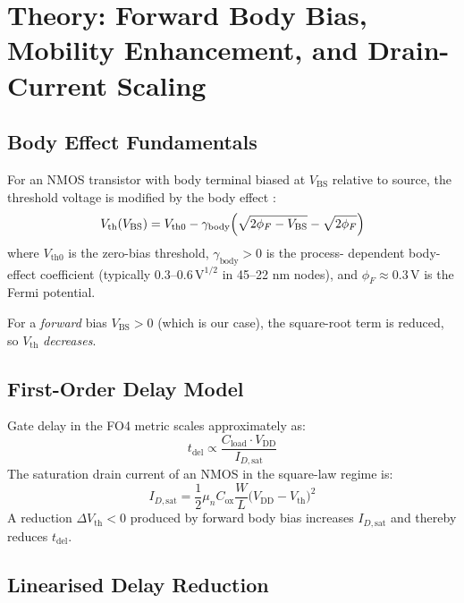 \documentclass[12pt,a4paper]{report}
\theoremstyle{plain}
\theoremstyle{definition}
\theoremstyle{remark}
\newcommand{\vdd}{V_{\mathrm{DD}}}
\newcommand{\tdel}{t_{\mathrm{del}}}
\begin{document}
\section{Theory: Forward Body Bias, Mobility Enhancement, and Drain-Current Scaling}
\label{sec:theory}

\subsection{Body Effect Fundamentals}

For an NMOS transistor with body terminal biased at $V_{\mathrm{BS}}$ relative to source, the
threshold voltage is modified by the body effect \citep{tschanz_jssc_2002}:
\begin{equation}
  V_{\mathrm{th}}(V_{\mathrm{BS}}) = V_{\mathrm{th0}} - \gamma_{\mathrm{body}}
    \Bigl(\sqrt{2\phi_{F} - V_{\mathrm{BS}}} - \sqrt{2\phi_{F}}\Bigr)
  \label{eq:vth_body}
\end{equation}
where $V_{\mathrm{th0}}$ is the zero-bias threshold, $\gamma_{\mathrm{body}} > 0$ is the process-
dependent body-effect coefficient (typically $0.3$--$0.6\,\mathrm{V}^{1/2}$ in 45--22 nm nodes),
and $\phi_{F} \approx 0.3\,\mathrm{V}$ is the Fermi potential.

For a \emph{forward} bias $V_{\mathrm{BS}} > 0$ (which is our case), the square-root term is
reduced, so $V_{\mathrm{th}}$ \emph{decreases}.

\subsection{First-Order Delay Model}

Gate delay in the FO4 metric scales approximately as:
\begin{equation}
  \tdel \propto \frac{C_{\mathrm{load}} \cdot \vdd}{I_{D,\mathrm{sat}}}
  \label{eq:delay_fo4}
\end{equation}
The saturation drain current of an NMOS in the square-law regime is:
\begin{equation}
  I_{D,\mathrm{sat}} = \frac{1}{2} \mu_{n} C_{\mathrm{ox}} \frac{W}{L}
    \bigl(\vdd - V_{\mathrm{th}}\bigr)^{2}
  \label{eq:ids_sat}
\end{equation}
A reduction $\Delta V_{\mathrm{th}} < 0$ produced by forward body bias increases $I_{D,\mathrm{sat}}$
and thereby reduces $\tdel$.

\subsection{Linearised Delay Reduction}
\end{document}
